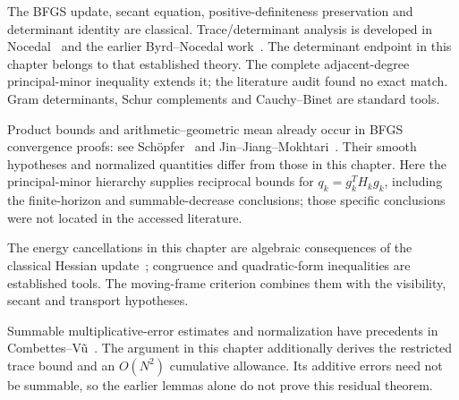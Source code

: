 The BFGS update, secant equation, positive-definiteness preservation and determinant identity are classical. Trace/determinant analysis is developed in Nocedal~\cite[Section~5, equations (5.7), (5.15) and (5.21)]{FND_N92} and the earlier Byrd--Nocedal work~\cite{FND_BN89}. The determinant endpoint in this chapter belongs to that established theory. The complete adjacent-degree principal-minor inequality extends it; the literature audit found no exact match. Gram determinants, Schur complements and Cauchy--Binet are standard tools.

Product bounds and arithmetic--geometric mean already occur in BFGS convergence proofs: see Sch\"opfer~\cite[proof of Theorem~3.7]{S16} and Jin--Jiang--Mokhtari~\cite[Appendices C--D]{FND_JJM24AW}. Their smooth hypotheses and normalized quantities differ from those in this chapter. Here the principal-minor hierarchy supplies reciprocal bounds for $q_k=g_k^TH_kg_k$, including the finite-horizon and summable-decrease conclusions; those specific conclusions were not located in the accessed literature.

The energy cancellations in this chapter are algebraic consequences of the classical Hessian update~\cite[Section~5]{FND_N92}; congruence and quadratic-form inequalities are established tools. The moving-frame criterion combines them with the visibility, secant and transport hypotheses.

Summable multiplicative-error estimates and normalization have precedents in Combettes--V\~u~\cite[Lemmas 2.2--2.3]{FND_CV13}. The argument in this chapter additionally derives the restricted trace bound and an $O(N^2)$ cumulative allowance. Its additive errors need not be summable, so the earlier lemmas alone do not prove this residual theorem.
